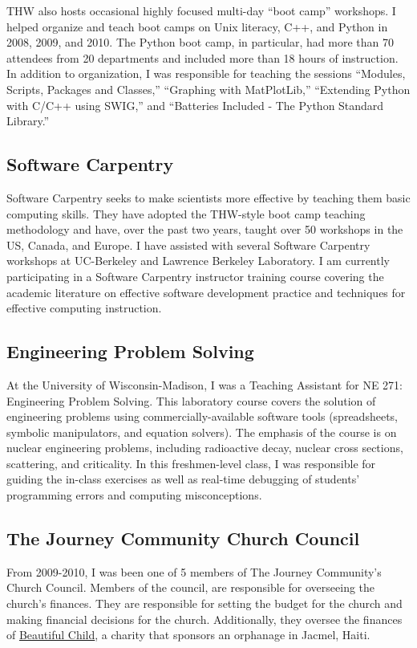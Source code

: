 \documentclass[letterpaper,11pt]{article}
\begin{document}
THW also hosts occasional highly focused multi-day ``boot camp'' workshops. I
helped organize and teach boot camps on Unix literacy, C++, and Python in 2008,
2009, and 2010.  The Python boot camp, in particular, had more than 70 attendees
from 20 departments and included more than 18 hours of instruction.  In
addition to organization, I was responsible for teaching the sessions
``Modules, Scripts, Packages and Classes,''  ``Graphing with MatPlotLib,''
``Extending Python with C/C++ using SWIG,''  and ``Batteries Included - The
Python Standard Library.''

\subsection*{Software Carpentry}
Software Carpentry seeks to make scientists more effective by teaching them
basic computing skills.  They have adopted the THW-style boot camp teaching
methodology and have, over the past two years, taught over 50 workshops in the
US, Canada, and Europe.  I have assisted with several Software Carpentry
workshops at UC-Berkeley and Lawrence Berkeley Laboratory.  I am currently
participating in a Software Carpentry instructor training course covering the
academic literature on effective software development practice and techniques
for effective computing instruction.

\subsection*{Engineering Problem Solving}
At the University of Wisconsin-Madison, I was a Teaching Assistant for NE 271:
Engineering Problem Solving.  This laboratory course covers the solution of engineering
problems using commercially-available software tools (spreadsheets, symbolic
manipulators, and equation solvers). The emphasis of the course is on nuclear
engineering problems, including radioactive decay, nuclear cross sections,
scattering, and criticality.  In this freshmen-level class, I was responsible
for guiding the in-class exercises as well as real-time debugging of students'
programming errors and computing misconceptions.

\subsection*{The Journey Community Church Council}
From 2009-2010, I was been one of 5 members of The Journey Community's Church
Council.  Members of the council, are responsible for overseeing the church's
finances.  They are responsible for setting the  budget for the church and
making financial decisions for the church.  Additionally, they oversee the
finances of \href{http://www.beautifulchild.org}{Beautiful Child}, a charity
that sponsors an orphanage in Jacmel, Haiti.
\end{document}

